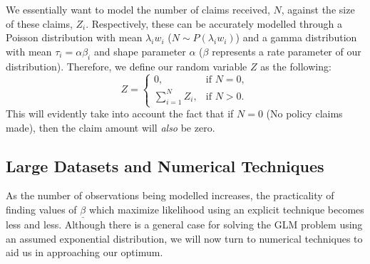 \documentclass{article}
\begin{document}
We essentially want to model the number of claims received, $N$, against the size of these claims, $Z_i$. Respectively, these can be accurately modelled through a Poisson distribution with mean $\lambda_i w_i$ ($N\sim P(\lambda_i w_i)$) and a gamma distribution with mean $\tau_i = \alpha\beta_i$ and shape parameter $\alpha$ ($\beta$ represents a rate parameter of our distribution). Therefore, we define our random variable $Z$ as the following:
\begin{equation}
    Z = \left\{ \begin{matrix} 0, & \text{if }N = 0, \\ \sum_{i=1}^N Z_i, & \text{if }N>0. \end{matrix}\right.
\end{equation}
This will evidently take into account the fact that if $N=0$ (No policy claims made), then the claim amount will \textit{also} be zero.

\subsection{Large Datasets and Numerical Techniques}
As the number of observations being modelled increases, the practicality of finding values of $\underline{\beta}$ which maximize likelihood using an explicit technique becomes less and less. Although there is a general case for solving the GLM problem using an assumed exponential distribution, we will now turn to numerical techniques to aid us in approaching our optimum.

\nocite{2008APG}
\nocite{géron2019hands}
\nocite{GLM_basics}
\printbibliography
\end{document}
